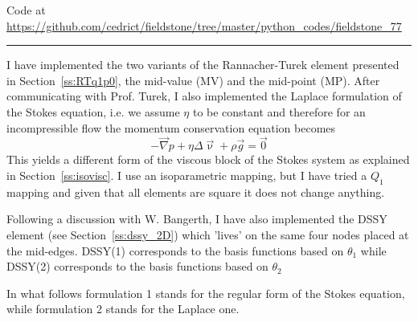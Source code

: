 

\begin{center}
Code at \url{https://github.com/cedrict/fieldstone/tree/master/python_codes/fieldstone_77}
\end{center}

\par\noindent\rule{\textwidth}{0.4pt}


I have implemented the two variants of the Rannacher-Turek element presented
in Section~\ref{ss:RTq1p0}, the mid-value (MV) and the mid-point (MP).
After communicating with Prof. Turek, I also implemented the Laplace 
formulation of the Stokes equation, i.e. we assume $\eta$ to be constant 
and therefore for an incompressible flow the momentum conservation 
equation becomes 
\[
-\vec\nabla p + \eta \Delta \vec\upnu + \rho \vec{g} = \vec{0}
\]
This yields a different form of the viscous block of the Stokes system
as explained in Section~\ref{ss:isovisc}.
I use an isoparametric mapping, but I have tried a $Q_1$ mapping and given that 
all elements are square it does not change anything. 

Following a discussion with W. Bangerth, I have also implemented the DSSY element 
(see Section~\ref{ss:dssy_2D}) which 'lives' on the same four nodes placed at 
the mid-edges. DSSY(1) corresponds to the basis functions based on $\theta_1$ 
while DSSY(2) corresponds to the basis functions based on $\theta_2$ \cite{doss99}

In what follows formulation 1 stands for the regular form of the 
Stokes equation, while formulation 2 stands for the Laplace one.

